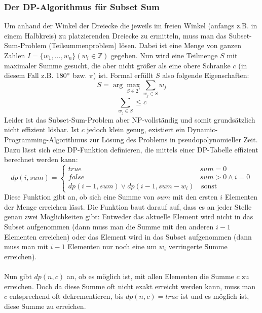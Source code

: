 \documentclass[a4paper, notitlepage, 12pt,headinclude]{scrartcl}
\begin{document}
  \subsubsection{Der DP-Algorithmus für Subset Sum}
  Um anhand der Winkel der Dreiecke die jeweils im freien Winkel (anfangs z.B. in einem Halbkreis) zu platzierenden Dreiecke zu ermitteln, muss man das Subset-Sum-Problem (Teilsummenproblem) lösen. Dabei ist eine Menge von ganzen Zahlen $I = \{w_1,...,w_n\} (w_i \in \mathbb{Z})$ gegeben. Nun wird eine Teilmenge $S$ mit maximaler Summe gesucht, die aber nicht größer als eine obere Schranke $c$ (in diesem Fall z.B. $180\degree$ bzw. $\pi$) ist. Formal erfüllt $S$ also folgende Eigenschaften:
  \begin{equation}
  S = \arg \max_{S \in 2^I} \sum_{w_j \in S} w_j
  \end{equation}
  \begin{equation}
  \sum_{w_j \in S} \leq c
  \end{equation}
  Leider ist das Subset-Sum-Problem aber NP-vollständig und somit grundsätzlich nicht effizient lösbar. Ist $c$ jedoch klein genug, existiert ein Dynamic-Programming-Algorithmus zur Lösung des Problems in pseudopolynomieller Zeit.\cite{Src:dpsum} Dazu lässt sich eine DP-Funktion definieren, die mittels einer DP-Tabelle effizient berechnet werden kann:
  \begin{equation*}
  dp(i,sum) = 
  \begin{cases}
  true & sum = 0 \\
  false & sum > 0 \wedge i = 0 \\
  dp(i-1,sum) \vee dp(i-1,sum-w_i) & \, \text{sonst}
  \end{cases}
  \end{equation*}
  Diese Funktion gibt an, ob sich eine Summe von $sum$ mit den ersten $i$ Elementen der Menge erreichen lässt. Die Funktion baut darauf auf, dass es an jeder Stelle genau zwei Möglichkeiten gibt: Entweder das aktuelle Element wird nicht in das Subset aufgenommen (dann muss man die Summe mit den anderen $i-1$ Elementen erreichen) oder das Element wird in das Subset aufgenommen (dann muss man mit $i-1$ Elementen nur noch eine um $w_i$ verringerte Summe erreichen). \\ \\
  Nun gibt $dp(n,c)$ an, ob es möglich ist, mit allen Elementen die Summe $c$ zu erreichen. Doch da diese Summe oft nicht exakt erreicht werden kann, muss man $c$ entsprechend oft dekrementieren, bis $dp(n,c) = true$ ist und es möglich ist, diese Summe zu erreichen. \\ \\
\end{document}
